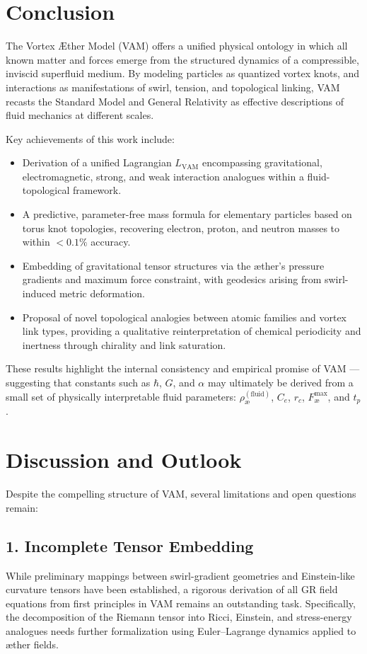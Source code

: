\section{Conclusion}

The Vortex Æther Model (VAM) offers a unified physical ontology in which all known matter and forces emerge from the structured dynamics of a compressible, inviscid superfluid medium. By modeling particles as quantized vortex knots, and interactions as manifestations of swirl, tension, and topological linking, VAM recasts the Standard Model and General Relativity as effective descriptions of fluid mechanics at different scales.

Key achievements of this work include:
\begin{itemize}
    \item Derivation of a unified Lagrangian $L_{\text{VAM}}$ encompassing gravitational, electromagnetic, strong, and weak interaction analogues within a fluid-topological framework.
    \item A predictive, parameter-free mass formula for elementary particles based on torus knot topologies, recovering electron, proton, and neutron masses to within $<0.1\%$ accuracy.
    \item Embedding of gravitational tensor structures via the æther's pressure gradients and maximum force constraint, with geodesics arising from swirl-induced metric deformation.
    \item Proposal of novel topological analogies between atomic families and vortex link types, providing a qualitative reinterpretation of chemical periodicity and inertness through chirality and link saturation.
\end{itemize}

These results highlight the internal consistency and empirical promise of VAM — suggesting that constants such as $\hbar$, $G$, and $\alpha$ may ultimately be derived from a small set of physically interpretable fluid parameters: $\rho_{\text{\ae}}^{(\text{fluid})}$, $C_e$, $r_c$, $F^{\max}_{\text{\ae}}$, and $t_p$.

\vspace{1em}
\section{Discussion and Outlook}

Despite the compelling structure of VAM, several limitations and open questions remain:

\subsection*{1. Incomplete Tensor Embedding}
While preliminary mappings between swirl-gradient geometries and Einstein-like curvature tensors have been established, a rigorous derivation of all GR field equations from first principles in VAM remains an outstanding task. Specifically, the decomposition of the Riemann tensor into Ricci, Einstein, and stress-energy analogues needs further formalization using Euler–Lagrange dynamics applied to æther fields.

